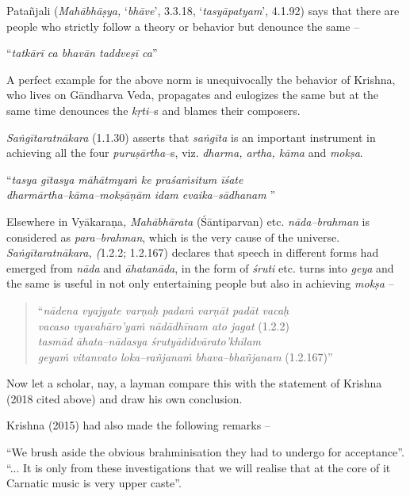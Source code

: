 Patañjali (\textit{Mahābhāṣya,} ‘\textit{bhāve}’, 3.3.18, ‘\textit{tasyāpatyam}’, 4.1.92) says that there are people who strictly follow a theory or behavior but denounce the same –

\begin{myquote}
“\textit{tatkārī ca bhavān taddveṣī ca}”
\end{myquote}

A perfect example for the above norm is unequivocally the behavior of Krishna, who lives on Gāndharva Veda, propagates and eulogizes the same but at the same time denounces the \textit{kṛti}–s and blames their composers. 

\textit{Saṅgītaratnākara} (1.1.30) asserts that \textit{saṅgīta} is an important instrument in achieving all the four \textit{puruṣārtha}–s, viz. \textit{dharma, artha, kāma} and \textit{mokṣa}.

\begin{myquote}
“\textit{tasya gītasya māhātmyaṁ ke praśaṁsitum īśate} \\\textit{dharmārtha–kāma–mokṣāṇām idam evaika–sādhanam} ”
\end{myquote}

Elsewhere in Vyākaraṇa\textit{, Mahābhārata} (Śāntiparvan) etc. \textit{nāda–brahman} is considered as \textit{para–brahman}, which is the very cause of the universe. \textit{Saṅgītaratnākara, (}1.2.2; 1.2.167) declares that speech in different forms had emerged from \textit{nāda} and \textit{āhatanāda}, in the form of \textit{śruti} etc. turns into \textit{geya} and the same is useful in not only entertaining people but also in achieving \textit{mokṣa} –

\begin{verse}
“\textit{nādena vyajyate varṇaḥ padaṁ varṇāt padāt vacaḥ} \\\textit{vacaso vyavahāro’yaṁ nādādhīnam ato jagat}  (1.2.2)\\\textit{tasmād āhata–nādasya śrutyādidvārato’khilam} \\\textit{geyaṁ vitanvato loka–rañjanaṁ bhava–bhañjanam}  (1.2.167)”
\end{verse}

Now let a scholar, nay, a layman compare this with the statement of Krishna (2018 cited above) and draw his own conclusion.

Krishna (2015) had also made the following remarks –  

\begin{myquote}
“We brush aside the obvious brahminisation they had to undergo for acceptance”. “... It is only from these investigations that we will realise that at the core of it Carnatic music is very upper caste”.
\end{myquote}

